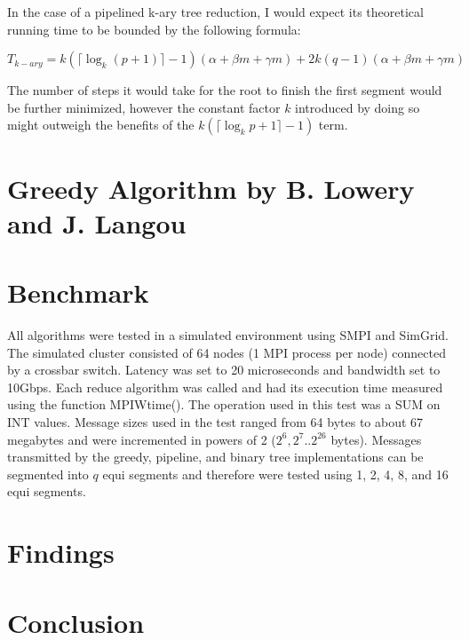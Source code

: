 \documentclass{article}
\begin{document}
\noindent In the case of a pipelined k-ary tree reduction, I would expect its theoretical running time 
to be bounded by the following formula:

$$T_{k-ary} = k(\lceil \log_k{(p+1)} \rceil - 1)(\alpha + \beta m + \gamma m) +
2k(q-1)(\alpha + \beta m + \gamma m)$$

\noindent The number of steps it would take for the root to finish the first segment would be 
further minimized, however the constant factor $k$ introduced by doing so might outweigh the benefits of the $k(\lceil \log_k{p+1} \rceil - 1)$ term.

\section{Greedy Algorithm by B. Lowery and J. Langou}

\section{Benchmark}

All algorithms were tested in a simulated environment using SMPI and SimGrid. The simulated
cluster consisted of 64 nodes (1 MPI process per node) connected by a crossbar switch. Latency was set to
20 microseconds and bandwidth set to 10Gbps. Each reduce algorithm was called and had its execution
time measured using the function MPIWtime(). The operation used in this test was a SUM on INT
values. Message sizes used in the test ranged from 64 bytes to about 67 megabytes and were incremented
in powers of 2 ($2^6, 2^7 .. 2^{26}$ bytes). Messages transmitted by the greedy, pipeline, and binary tree
implementations can be segmented into $q$ equi segments and therefore were tested using 1, 2, 4, 8, and 16
equi segments.

\section{Findings}

\section{Conclusion}
\end{document}
